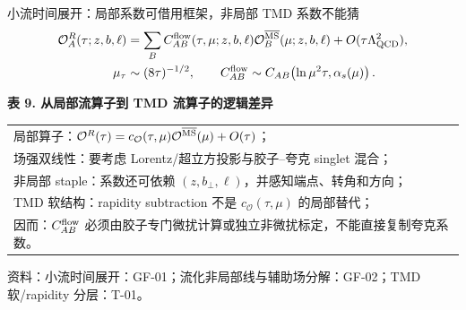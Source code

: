 \documentclass[UTF8,aspectratio=169,11pt]{ctexbeamer}
\newcommand{\source}[1]{%
  \par\vspace{-0.08em}%
  \noindent\parbox[t]{0.97\linewidth}{\raggedright\scriptsize\color{muted}资料：#1}\par}
\begin{document}
\begin{frame}[t]{小流时间展开：局部系数可借用框架，非局部 TMD 系数不能猜}
  \begin{align*}
    \mathcal O_A^R(\tau;z,b,\ell)
    &=\sum_B C_{AB}^{\rm flow}(\tau,\mu;z,b,\ell)
      \mathcal O_B^{\overline{\rm MS}}(\mu;z,b,\ell)
      +O(\tau\Lambda_{\rm QCD}^2),\\
    \mu_\tau&\sim(8\tau)^{-1/2},
    \qquad C_{AB}^{\rm flow}\sim
      C_{AB}\!\left(\ln\mu^2\tau,\alpha_s(\mu)\right).
  \end{align*}
  \begin{center}
  \textbf{表 9. 从局部流算子到 TMD 流算子的逻辑差异}
  \vspace{0.12em}
  {\scriptsize\begin{tabular}{@{}p{\linewidth}@{}}
    \toprule
    局部算子：$\mathcal O^R(\tau)=c_\mathcal O(\tau,\mu)\mathcal O^{\overline{\rm MS}}(\mu)+O(\tau)$；\\
    场强双线性：要考虑 Lorentz/超立方投影与胶子--夸克 singlet 混合；\\
    非局部 staple：系数还可依赖 $(z,b_\perp,\ell)$，并感知端点、转角和方向；\\
    TMD 软结构：rapidity subtraction 不是 $c_\mathcal O(\tau,\mu)$ 的局部替代；\\
    因而：$C_{AB}^{\rm flow}$ 必须由胶子专门微扰计算或独立非微扰标定，不能直接复制夸克系数。\\
    \bottomrule
  \end{tabular}}
  \end{center}
  \source{小流时间展开：GF-01；流化非局部线与辅助场分解：GF-02；TMD 软/rapidity 分层：T-01。}
\end{frame}
\end{document}

